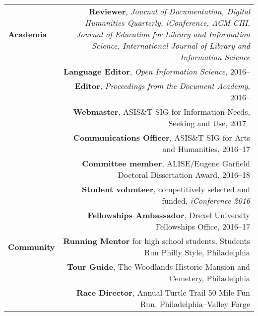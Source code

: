 \documentclass[letterpaper,11pt]{article}
\begin{document}
\begin{longtable}{ @{} L @{} R @{} }
	
\textbf{Academia} & \textbf{Reviewer}, \emph{Journal of Documentation, Digital Humanities Quarterly, iConference, ACM CHI, Journal of Education for Library and Information Science, International Journal of Library and Information Science}\\
\quad & \textbf{Language Editor}, \emph{Open Information Science}, 2016--\\
& \textbf{Editor}, \emph{Proceedings from the Document Academy}, 2016--\\
\quad & \textbf{Webmaster}, ASIS\&T SIG for Information Needs, Seeking and Use, 2017--\\
& \textbf{Communications Officer}, ASIS\&T SIG for Arts and Humanities, 2016--17\\
& \textbf{Committee member}, ALISE/Eugene Garfield Doctoral Dissertation Award, 2016--18\\
& \textbf{Student volunteer}, competitively selected and funded, \emph{iConference 2016}\\
& \textbf{Fellowships Ambassador}, Drexel University Fellowships Office, 2016--17\\[1em]

\textbf{Community}& \textbf{Running Mentor} for high school students, Students Run Philly Style, Philadelphia\\
\quad & \textbf{Tour Guide}, The Woodlands Historic Mansion and Cemetery, Philadelphia\\
\quad & \textbf{Race Director}, Annual Turtle Trail 50 Mile Fun Run, Philadelphia--Valley Forge
		


\end{longtable}
\end{document}
